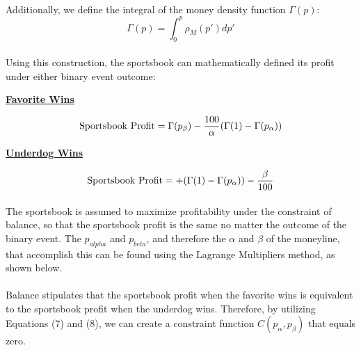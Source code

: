 \documentclass[12pt,letterpaper]{article}
\begin{document}
\paragraph{} Additionally, we define the integral of the money density function $\Gamma(p)$:
\begin{equation}
\Gamma(p) = \int_0^p\rho_M(p') dp'
\end{equation}

\paragraph{} Using this construction, the sportsbook can mathematically defined its profit under either binary event outcome: 

\pagebreak

\begin{center}
\underline{\textbf{Favorite Wins}}
\end{center}
\vspace{-1pt}
\begin{equation}
\textnormal{Sportsbook Profit} = \Gamma(p_\beta)-\frac{100}{\alpha}(\Gamma(1)-\Gamma(p_\alpha)) 
\end{equation}

\begin{center}
\underline{\textbf{Underdog Wins}}
\end{center}
\vspace{-1pt}
\begin{equation}
\textnormal{Sportsbook Profit} =  +(\Gamma(1)-\Gamma(p_\alpha)) - \frac{\beta}{100}
\end{equation}

\paragraph{} The sportsbook is assumed to maximize profitability under the constraint of balance, so that the sportsbook profit is the same no matter the outcome of the binary event. The $p_{alpha}$ and $p_{beta}$, and therefore the $\alpha$ and $\beta$ of the moneyline, that accomplish this can be found using the Lagrange Multipliers method, as shown below.

\paragraph{} Balance stipulates that the sportsbook profit when the favorite wins is equivalent to the sportsbook profit when the underdog wins. Therefore, by utilizing Equations (7) and (8), we can create a constraint function $C(p_\alpha,p_\beta)$ that equals zero.
\end{document}
